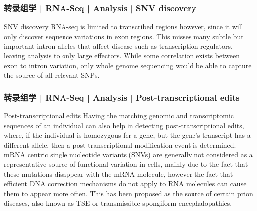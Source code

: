 \begin{frame}
  \frametitle{转录组学 | RNA-Seq | Analysis | SNV discovery}
  \begin{block}{SNV discovery}
    RNA-seq is limited to transcribed regions however, since it will only discover sequence variations in exon regions. This misses many subtle but important intron alleles that affect disease such as transcription regulators, leaving analysis to only large effectors. While some correlation exists between exon to intron variation, only whole genome sequencing would be able to capture the source of all relevant SNPs.
  \end{block}
\end{frame}

\begin{frame}
  \frametitle{转录组学 | RNA-Seq | Analysis | Post-transcriptional edits}
  \begin{block}{Post-transcriptional edits}
    Having the matching genomic and transcriptomic sequences of an individual can also help in detecting post-transcriptional edits, where, if the individual is homozygous for a gene, but the gene's transcript has a different allele, then a post-transcriptional modification event is determined.\\
    \vspace{1em}
    mRNA centric single nucleotide variants (SNVs) are generally not considered as a representative source of functional variation in cells, mainly due to the fact that these mutations disappear with the mRNA molecule, however the fact that efficient DNA correction mechanisms do not apply to RNA molecules can cause them to appear more often. This has been proposed as the source of certain prion diseases, also known as TSE or transmissible spongiform encephalopathies.
  \end{block}
\end{frame}

